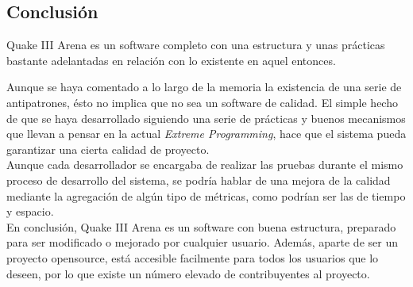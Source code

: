 \documentclass[a4paper,12pt]{report}
\begin{document}
    \subsection{Conclusión}
	Quake III Arena es un software completo con una estructura y unas prácticas bastante adelantadas en relación con lo existente en aquel entonces.
	
	Aunque se haya comentado a lo largo de la memoria la existencia de una serie de antipatrones, ésto no implica que no sea un software de calidad. El simple hecho de que se haya desarrollado siguiendo una serie de prácticas y buenos mecanismos que llevan a pensar en la actual \textit{Extreme Programming}, hace que el sistema pueda garantizar una cierta calidad de proyecto.\\
	
	Aunque cada desarrollador se encargaba de realizar las pruebas durante el mismo proceso de desarrollo del sistema, se podría hablar de una mejora de la calidad mediante la agregación de algún tipo de métricas, como podrían ser las de tiempo y espacio.\\
	
	En conclusión, Quake III Arena es un software con buena estructura, preparado para ser modificado o mejorado por cualquier usuario. Además, aparte de ser un proyecto opensource, está accesible facilmente para todos los usuarios que lo deseen, por lo que existe un número elevado de contribuyentes al proyecto.
	
    
	
\end{document}
